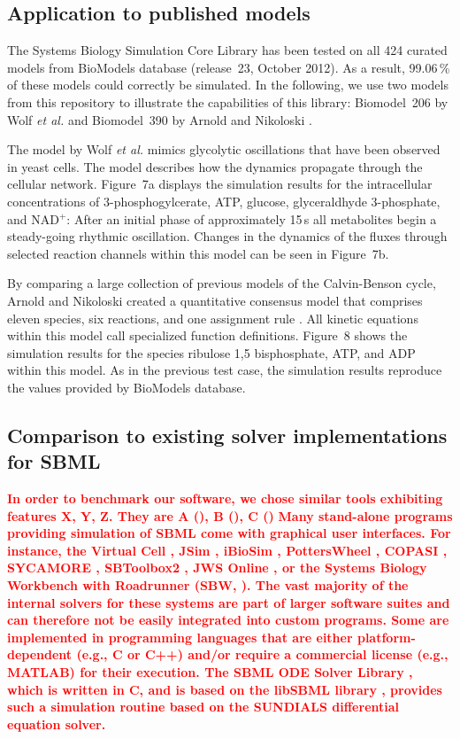 \documentclass[10pt]{bmc_article}
\newenvironment{bmcformat}{\baselineskip20pt\sloppy\setboolean{publ}{false}}{\baselineskip20pt\sloppy}
\newcommand{\TODO}[1]{\textcolor{red}{\textbf{#1}}}
\begin{document}
\begin{bmcformat}
\subsection*{Application to published models}

The Systems Biology Simulation Core Library has been tested on all 424 curated
models from BioModels database \cite{Novere2006a} (release~23, October 2012).
As a result, 99.06\,\% of these models could correctly be simulated.
In the following, we use two models from this repository to illustrate the
capabilities of this library:
Biomodel~206 by Wolf \emph{et al.} \cite{Wolf2000} and Biomodel~390 by Arnold 
and Nikoloski \cite{Arnold2011}.

The model by Wolf \emph{et al.} \cite{Wolf2000} mimics glycolytic oscillations
that have been observed in yeast cells.
The model describes how the dynamics propagate through the cellular network.
Figure~7a displays the simulation results for the intracellular concentrations
of 3-phosphogylcerate, ATP, glucose, glyceraldhyde 3-phosphate, and NAD$^+$:
After an initial phase of approximately 15\,s all metabolites begin a
steady-going rhythmic oscillation.
Changes in the dynamics of the fluxes through selected reaction channels within
this model can be seen in Figure~7b. 

By comparing a large collection of previous models of the Calvin-Benson
cycle, Arnold and Nikoloski created a quantitative consensus model that
comprises eleven species, six reactions, and one assignment rule
\cite{Arnold2011}.
All kinetic equations within this model call specialized function definitions.
Figure~8 shows the simulation results for the species ribulose 1,5 bisphosphate,
ATP,  and ADP within this model.
As in the previous test case, the simulation results reproduce the values
provided by BioModels database.  

\subsection*{Comparison to existing solver implementations for SBML}

\TODO{In order to benchmark our software, we chose similar tools exhibiting features X, Y, Z. They are A (), B (), C ()}
\TODO{Many stand-alone programs providing simulation of SBML come with graphical user
interfaces.
For instance, the Virtual Cell \cite{Loew2001}, JSim \cite{Beard2012a}, iBioSim 
\cite{Myers2009}, PottersWheel \cite{Maiwald2008}, COPASI \cite{Hoops2006},
SYCAMORE \cite{Weidemann2008}, SBToolbox2
\cite{SBT_Schmidt2006}, JWS Online \cite{Olivier2004}, or the Systems Biology
Workbench with Roadrunner (SBW, \cite{Bergmann06}). 
The vast majority of the internal solvers for these systems are part of
larger software suites and can therefore not be easily integrated into custom
programs. Some are implemented in programming languages that are either
platform-dependent (e.g., C or C++) and/or require a commercial license (e.g.,
MATLAB\texttrademark{}) for their execution.
The SBML ODE Solver Library \cite{Machne2006}, which is written in C,
and is based on the libSBML library \cite{Bornstein2008}, 
provides such a simulation routine based on the SUNDIALS differential equation
solver.}


\end{bmcformat}
\end{document}
